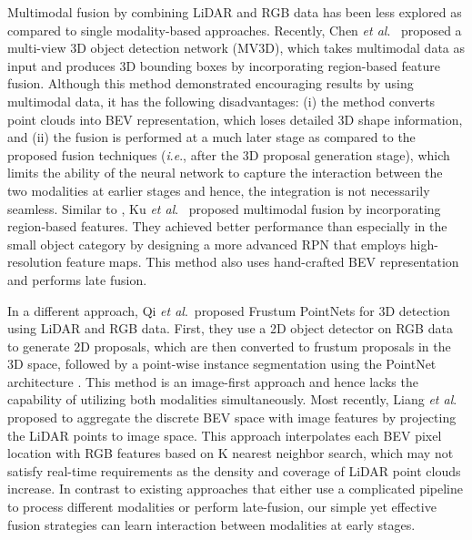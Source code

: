 \documentclass[letterpaper, 10 pt, conference]{ieeeconf}
\newcommand{\etal}{\textit{et al}.  {\,}}
\newcommand{\ie}{\textit{i}.\textit{e}.}
\begin{document}
Multimodal fusion by combining LiDAR and RGB data has been less explored as compared to single modality-based approaches. Recently, Chen \etal \cite{REF:cvpr17chen} proposed a multi-view 3D object detection network (MV3D), which takes multimodal data as input and produces 3D bounding boxes by incorporating region-based feature fusion. Although this method demonstrated encouraging results by using multimodal data, it has the following disadvantages: (i) the method converts point clouds into BEV representation, which loses detailed 3D shape information, and (ii) the fusion is performed at a much later stage as compared to the proposed fusion techniques (\ie, after the 3D proposal generation stage), which limits the ability of the neural network to capture the interaction between the two modalities at earlier stages and hence, the integration is not necessarily seamless. Similar to \cite{REF:cvpr17chen}, Ku \etal \cite{ku2017joint} proposed multimodal fusion by incorporating region-based features. They achieved better performance than \cite{REF:cvpr17chen} especially in the small object category by designing a more advanced RPN that employs high-resolution feature maps. This method also uses hand-crafted BEV representation and performs late fusion. 

In a different approach, Qi \etal proposed Frustum PointNets \cite{REF:qi2017frustum} for 3D detection using LiDAR and RGB data. First, they use a 2D object detector on RGB data to generate 2D proposals, which are then converted to frustum proposals in the 3D space, followed by a point-wise instance segmentation using the PointNet architecture \cite{REF:qi2017pointnet}. This method is an image-first  approach and hence lacks the capability of utilizing both modalities simultaneously. Most recently, Liang \etal \cite{Liang_2018_ECCV} proposed to aggregate the discrete BEV space with image features by projecting the LiDAR points to image space. This approach interpolates each BEV pixel location with RGB features based on K nearest neighbor search, which may not satisfy real-time requirements as the density and coverage of LiDAR point clouds increase. 
In contrast to existing approaches that either use a complicated pipeline to process different modalities or perform late-fusion, our simple yet effective fusion strategies can learn interaction between modalities at early stages.
\end{document}
